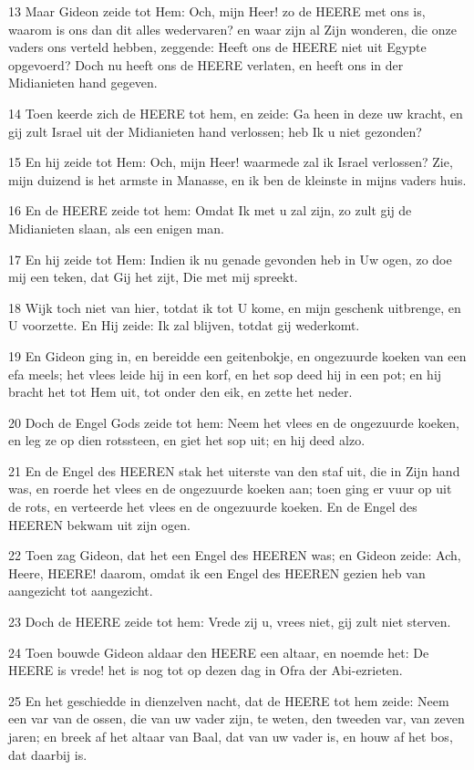 \par 13 Maar Gideon zeide tot Hem: Och, mijn Heer! zo de HEERE met ons is, waarom is ons dan dit alles wedervaren? en waar zijn al Zijn wonderen, die onze vaders ons verteld hebben, zeggende: Heeft ons de HEERE niet uit Egypte opgevoerd? Doch nu heeft ons de HEERE verlaten, en heeft ons in der Midianieten hand gegeven.
\par 14 Toen keerde zich de HEERE tot hem, en zeide: Ga heen in deze uw kracht, en gij zult Israel uit der Midianieten hand verlossen; heb Ik u niet gezonden?
\par 15 En hij zeide tot Hem: Och, mijn Heer! waarmede zal ik Israel verlossen? Zie, mijn duizend is het armste in Manasse, en ik ben de kleinste in mijns vaders huis.
\par 16 En de HEERE zeide tot hem: Omdat Ik met u zal zijn, zo zult gij de Midianieten slaan, als een enigen man.
\par 17 En hij zeide tot Hem: Indien ik nu genade gevonden heb in Uw ogen, zo doe mij een teken, dat Gij het zijt, Die met mij spreekt.
\par 18 Wijk toch niet van hier, totdat ik tot U kome, en mijn geschenk uitbrenge, en U voorzette. En Hij zeide: Ik zal blijven, totdat gij wederkomt.
\par 19 En Gideon ging in, en bereidde een geitenbokje, en ongezuurde koeken van een efa meels; het vlees leide hij in een korf, en het sop deed hij in een pot; en hij bracht het tot Hem uit, tot onder den eik, en zette het neder.
\par 20 Doch de Engel Gods zeide tot hem: Neem het vlees en de ongezuurde koeken, en leg ze op dien rotssteen, en giet het sop uit; en hij deed alzo.
\par 21 En de Engel des HEEREN stak het uiterste van den staf uit, die in Zijn hand was, en roerde het vlees en de ongezuurde koeken aan; toen ging er vuur op uit de rots, en verteerde het vlees en de ongezuurde koeken. En de Engel des HEEREN bekwam uit zijn ogen.
\par 22 Toen zag Gideon, dat het een Engel des HEEREN was; en Gideon zeide: Ach, Heere, HEERE! daarom, omdat ik een Engel des HEEREN gezien heb van aangezicht tot aangezicht.
\par 23 Doch de HEERE zeide tot hem: Vrede zij u, vrees niet, gij zult niet sterven.
\par 24 Toen bouwde Gideon aldaar den HEERE een altaar, en noemde het: De HEERE is vrede! het is nog tot op dezen dag in Ofra der Abi-ezrieten.
\par 25 En het geschiedde in dienzelven nacht, dat de HEERE tot hem zeide: Neem een var van de ossen, die van uw vader zijn, te weten, den tweeden var, van zeven jaren; en breek af het altaar van Baal, dat van uw vader is, en houw af het bos, dat daarbij is.
